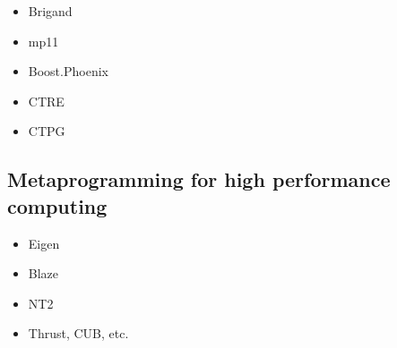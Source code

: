 \documentclass[../../main.tex]{subfiles}
\begin{document}
\begin{itemize}
\item Brigand

\item mp11
\end{itemize}


\begin{itemize}
\item Boost.Phoenix

\item CTRE

\item CTPG
\end{itemize}

\subsection{Metaprogramming for high performance computing}

\begin{itemize}
\item Eigen

\item Blaze

\item NT2

\item Thrust, CUB, etc.
\end{itemize}
\end{document}
